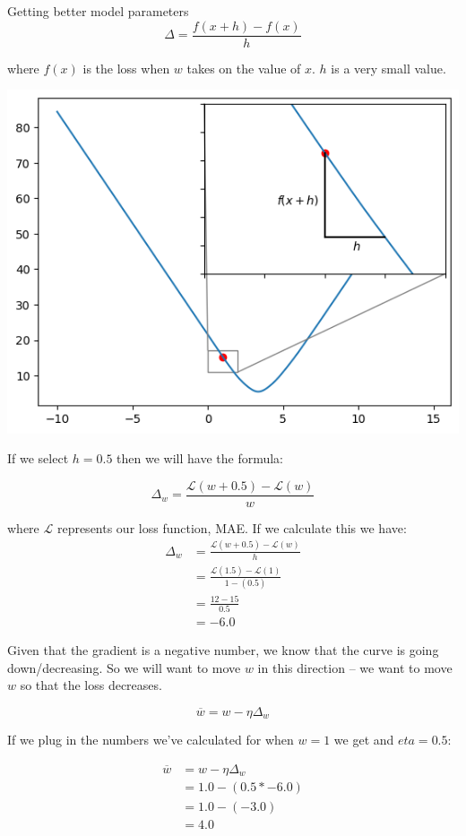 \documentclass[10pt]{beamer}
\begin{document}
\begin{frame}[fragile,allowframebreaks,label=]{Getting better model parameters}
\[
\Delta = \frac{f(x+h) - f(x)}{h}
\]

where \(f(x)\) is the loss when \(w\) takes on the value of \(x\). \(h\) is a very small
value.

\begin{center}
\includegraphics[width=.9\linewidth]{images/small_step.png}
\end{center}

If we select \(h = 0.5\) then we will have the formula:

\[
\Delta_w = \frac{\mathcal{L}(w + 0.5) - \mathcal{L}(w)}{w}
\]

where \(\mathcal{L}\) represents our loss function, MAE. If we calculate this we have:
\[\begin{aligned}
\Delta_w &= \frac{\mathcal{L}(w + 0.5) - \mathcal{L}(w)}{h} \\
&= \frac{\mathcal{L}(1.5)- \mathcal{L}(1)}{1  - (0.5)} \\
&= \frac{12 - 15}{0.5} \\
&= -6.0
\end{aligned}\]

Given that the gradient is a negative number, we know that the curve is going
down/decreasing. So we will want to move \(w\) in this direction -- we want to move
\(w\) so that the loss decreases.

\[
\overline{w} = w - \eta \Delta_w
\]

If we plug in the numbers we've calculated for when \(w = 1\) we get and \(eta = 0.5\):

\[\begin{aligned}
\overline{w} &= w - \eta \Delta_w \\
&= 1.0 - (0.5 * -6.0) \\
&= 1.0 - (-3.0) \\
&= 4.0
\end{aligned}\]


\end{frame}
\end{document}
